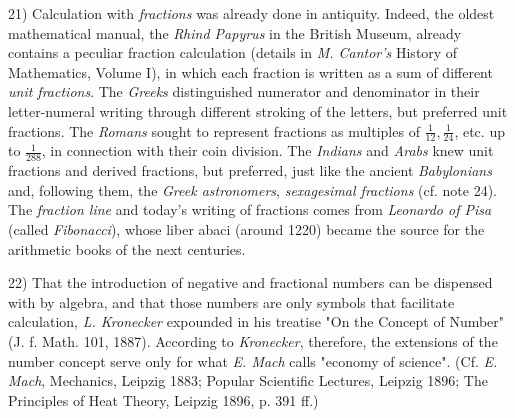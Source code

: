 \vfill
\leftline{\rule{2in}{0.4pt}}
\vspace{0.2cm}
{
\footnotesize
21) Calculation with \textit{fractions} was already done in antiquity. Indeed, the oldest mathematical manual, the \textit{Rhind Papyrus} in the British Museum, already contains a peculiar fraction calculation (details in \textit{M. Cantor's} History of Mathematics, Volume I), in which each fraction is written as a sum of different \textit{unit fractions}. The \textit{Greeks} distinguished numerator and denominator in their letter-numeral writing through different stroking of the letters, but preferred unit fractions. The \textit{Romans} sought to represent fractions as multiples of $\frac{1}{12}, \frac{1}{24}$, etc. up to $\frac{1}{288}$, in connection with their coin division. The \textit{Indians} and \textit{Arabs} knew unit fractions and derived fractions, but preferred, just like the ancient \textit{Babylonians} and, following them, the \textit{Greek astronomers}, \textit{sexagesimal fractions} (cf. note 24). The \textit{fraction line} and today's writing of fractions comes from \textit{Leonardo of Pisa} (called \textit{Fibonacci}), whose liber abaci (around 1220) became the source for the arithmetic books of the next centuries.

22) That the introduction of negative and fractional numbers can be dispensed with by algebra, and that those numbers are only symbols that facilitate calculation, \textit{L. Kronecker} expounded in his treatise "On the Concept of Number" (J. f. Math. 101, 1887). According to \textit{Kronecker}, therefore, the extensions of the number concept serve only for what \textit{E. Mach} calls "economy of science". (Cf. \textit{E. Mach}, Mechanics, Leipzig 1883; Popular Scientific Lectures, Leipzig 1896; The Principles of Heat Theory, Leipzig 1896, p. 391 ff.)

}
